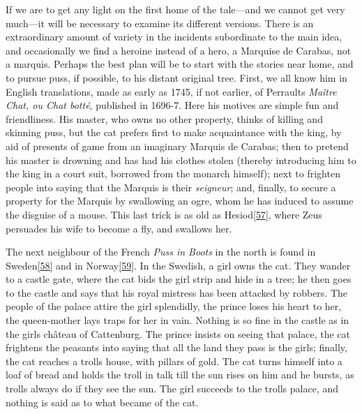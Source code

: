 \documentclass[14pt,a4paper]{memoir}
\begin{document}
If we are to get any light on the first home of the tale---and we cannot
get very much---it will be necessary to examine its different versions.
There is an extraordinary amount of variety in the incidents subordinate
to the main idea, and occasionally we find a heroine instead of a hero,
a Marquise de Carabas, not a marquis. Perhaps the best plan will be to
start with the stories near home, and to pursue puss, if possible, to
his distant original tree. First, we all know him in English
translations, made as early as 1745, if not earlier, of
Perrault\textquotesingle s \emph{Maître Chat, ou Chat botté}, published
in 1696-7. Here his motives are simple fun and friendliness. His master,
who owns no other property, thinks of killing and skinning puss, but the
cat prefers first to make acquaintance with the king, by aid of presents
of game from an imaginary Marquis de Carabas; then to pretend his master
is drowning and has had his clothes stolen (thereby introducing him to
the king in a court suit, borrowed from the monarch himself); next to
frighten people into saying that the Marquis is their \emph{seigneur};
and, finally, to secure a property for the Marquis by swallowing an
ogre, whom he has induced to assume the disguise of a mouse. This last
trick is as old as
Hesiod\protect\hypertarget{4533318093929944247_33931-h-0.htm.xhtmlux5cux23FNanchor_57}{}{}\protect\hyperlink{4533318093929944247_33931-h-1.htm.xhtmlux5cux23Footnote_57}{{[}57{]}},
where Zeus persuades his wife to become a fly, and swallows her.

The next neighbour of the French \emph{Puss in Boots} in the north is
found in
Sweden\protect\hypertarget{4533318093929944247_33931-h-0.htm.xhtmlux5cux23FNanchor_58}{}{}\protect\hyperlink{4533318093929944247_33931-h-1.htm.xhtmlux5cux23Footnote_58}{{[}58{]}}
and in
Norway\protect\hypertarget{4533318093929944247_33931-h-0.htm.xhtmlux5cux23FNanchor_59}{}{}\protect\hyperlink{4533318093929944247_33931-h-1.htm.xhtmlux5cux23Footnote_59}{{[}59{]}}.
In the Swedish, a girl owns the cat. They wander to a castle gate, where
the cat bids the girl strip and hide in a tree; he then goes to the
castle and says that his royal mistress has been attacked by robbers.
The people of the palace attire the girl splendidly, the prince loses
his heart to her, the queen-mother lays traps for her in vain. Nothing
is so fine in the castle as in the girl\textquotesingle s château of
Cattenburg. The prince insists on seeing that palace, the cat frightens
the peasants into saying that all the land they pass is the
girl\textquotesingle s; finally, the cat reaches a
troll\textquotesingle s house, with pillars of gold. The cat turns
himself into a loaf of bread and holds the troll in talk till the sun
rises on him and he bursts, as trolls always do if they see the sun. The
girl succeeds to the troll\textquotesingle s palace, and nothing is said
as to what became of the cat.
\end{document}
